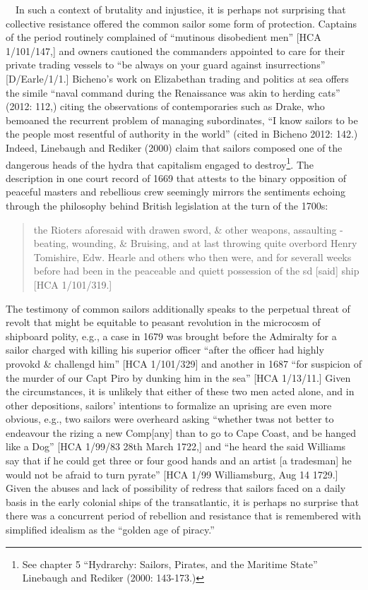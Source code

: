 \documentclass[12pt]{article}
\newenvironment{styleStandard}{\renewcommand\baselinestretch{1.0}\setlength\leftskip{0cm}\setlength\rightskip{0cm plus 1fil}\setlength\parindent{0cm}\setlength\parfillskip{0pt plus 1fil}\setlength\parskip{0in plus 1pt}\writerlistparindent\writerlistleftskip\leavevmode\normalfont\normalsize\writerlistlabel\ignorespaces}{\unskip\vspace{0in plus 1pt}\par}
\newcommand\writerlistleftskip{}
\newcommand\writerlistparindent{}
\newcommand\writerlistlabel{}
\begin{document}
\begin{styleStandard}
\ \ In such a context of brutality and injustice, it is perhaps not surprising that collective resistance offered the common sailor some form of protection. Captains of the period routinely complained of “mutinous disobedient men” [HCA 1/101/147,] and owners cautioned the commanders appointed to care for their private trading vessels to “be always on your guard against insurrections” [D/Earle/1/1.] Bicheno’s work on Elizabethan trading and politics at sea offers the simile “naval command during the Renaissance was akin to herding cats” (2012: 112,) citing the observations of contemporaries such as Drake, who bemoaned the recurrent problem of managing subordinates, “I know sailors to be the people most resentful of authority in the world” (cited in Bicheno 2012: 142.) Indeed, Linebaugh and Rediker (2000) claim that sailors composed one of the dangerous heads of the hydra that capitalism engaged to destroy\footnote{ See chapter 5 “Hydrarchy: Sailors, Pirates, and the Maritime State” Linebaugh and Rediker (2000: 143-173.)}. The description in one court record of 1669 that attests to the binary opposition of peaceful masters and rebellious crew seemingly mirrors the sentiments echoing through the philosophy behind British legislation at the turn of the 1700s:
\end{styleStandard}


\begin{quotation}
the Rioters aforesaid with drawen sword, \& other weapons, assaulting - beating, wounding, \& Bruising, and at last throwing quite overbord Henry Tomishire, Edw. Hearle and others who then were, and for severall weeks before had been in the peaceable and quiett possession of the sd [said] ship [HCA 1/101/319.] 

\end{quotation}
\begin{styleStandard}
The testimony of common sailors additionally speaks to the perpetual threat of revolt that might be equitable to peasant revolution in the microcosm of shipboard polity, e.g., a case in 1679 was brought before the Admiralty for a sailor charged with killing his superior officer “after the officer had highly provokd \& challengd him” [HCA 1/101/329] and another in 1687 “for suspicion of the murder of our Capt Piro by dunking him in the sea” [HCA 1/13/11.] Given the circumstances, it is unlikely that either of these two men acted alone, and in other depositions, sailors’ intentions to formalize an uprising are even more obvious, e.g., two sailors were overheard asking “whether twas not better to endeavour the rizing a new Comp[any] than to go to Cape Coast, and be hanged like a Dog” [HCA 1/99/83 28th March 1722,] and “he heard the said Williams say that if he could get three or four good hands and an artist [a tradesman] he would not be afraid to turn pyrate” [HCA 1/99 Williamsburg, Aug 14 1729.] Given the abuses and lack of possibility of redress that sailors faced on a daily basis in the early colonial ships of the transatlantic, it is perhaps no surprise that there was a concurrent period of rebellion and resistance that is remembered with simplified idealism as the “golden age of piracy.”
\end{styleStandard}
\end{document}
